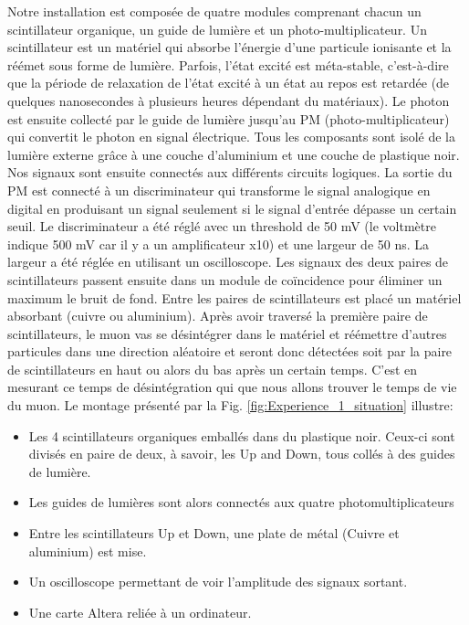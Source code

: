\documentclass[12pt]{article}
\begin{document}
Notre installation est composée de quatre modules comprenant chacun un scintillateur organique, un guide de lumière et un photo-multiplicateur. Un scintillateur est un matériel qui absorbe l'énergie d'une particule ionisante et la réémet sous forme de lumière. Parfois, l'état excité est méta-stable, c'est-à-dire que la période de relaxation de l'état excité à un état au repos est retardée (de quelques nanosecondes à plusieurs heures dépendant du matériaux). Le photon est ensuite collecté par le guide de lumière jusqu'au PM (photo-multiplicateur) qui convertit le photon en signal électrique. Tous les composants sont isolé de la lumière externe grâce à une couche d'aluminium et une couche de plastique noir.
Nos signaux sont ensuite connectés aux différents circuits logiques. La sortie du PM est connecté à un discriminateur qui transforme le signal analogique en digital en produisant un signal seulement si le signal d'entrée dépasse un certain seuil. Le discriminateur a été réglé avec un threshold de 50 mV (le voltmètre indique 500 mV car il y a un amplificateur x10) et une largeur de 50 ns. La largeur a été réglée en utilisant un oscilloscope. Les signaux des deux paires de scintillateurs passent ensuite dans un module de coïncidence pour éliminer un maximum le bruit de fond.
Entre les paires de scintillateurs est placé un matériel absorbant (cuivre ou aluminium). Après avoir traversé la première paire de scintillateurs, le muon vas se désintégrer dans le matériel et réémettre d'autres particules dans une direction aléatoire et seront donc détectées soit par la paire de scintillateurs en haut ou alors du bas après un certain temps. C'est en mesurant ce temps de désintégration qui que nous allons trouver le temps de vie du muon. Le montage présenté par la Fig. \ref{fig:Experience_1_situation} illustre: 
\begin{itemize}
    \item   Les 4 scintillateurs organiques emballés dans du plastique noir. Ceux-ci sont divisés en paire de deux, à savoir, les Up and Down, tous collés à des guides de lumière. 
    \item Les guides de lumières sont alors connectés aux quatre photomultiplicateurs
    \item   Entre les scintillateurs Up et Down, une plate de métal (Cuivre et aluminium) est mise.
    \item   Un oscilloscope permettant de voir l'amplitude des signaux sortant.
    \item Une carte Altera reliée à un ordinateur.
\end{itemize}
\end{document}
